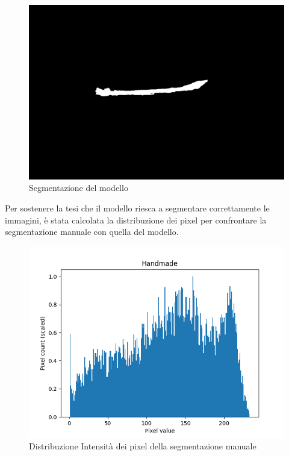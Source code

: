 \begin{figure}[H]
    \centering
    \includegraphics[width=0.7\columnwidth]{Immagini/prediction.png}
    \caption{Segmentazione del modello}
    \label{fig:segmentazione del modello}
\end{figure}



Per sostenere la tesi che il modello riesca a segmentare correttamente le immagini, \`e stata 
calcolata la distribuzione dei pixel per confrontare la segmentazione manuale con quella del modello.


\begin{figure}[H]
    \centering
    \includegraphics[width=0.7\columnwidth]{Immagini/handmade_scaled_hist.png}
    \caption{Distribuzione Intensità dei pixel della segmentazione manuale}
    \label{fig:distribuzione intensità dei pixel della segmentazione manuale}
\end{figure}

